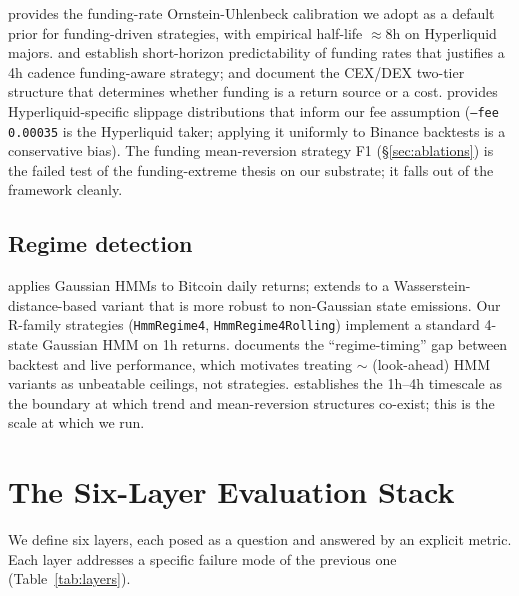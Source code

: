 \documentclass[11pt]{article}
\begin{document}
\citet{le2026fundingmm} provides the funding-rate Ornstein-Uhlenbeck
calibration we adopt as a default prior for funding-driven strategies, with
empirical half-life $\approx 8$h on Hyperliquid majors.
\citet{badawi2026funding4h} and \citet{inan2025fundingpred} establish
short-horizon predictability of funding rates that justifies a 4h cadence
funding-aware strategy; \citet{twotiered2026} and \citet{dexcarry2025} document
the CEX/DEX two-tier structure that determines whether funding is a return
source or a cost. \citet{sar2026} provides Hyperliquid-specific slippage
distributions that inform our fee assumption (\texttt{--fee 0.00035} is the
Hyperliquid taker; applying it uniformly to Binance backtests is a
conservative bias). The funding mean-reversion strategy F1
(\S\ref{sec:ablations}) is the failed test of the funding-extreme thesis on
our substrate; it falls out of the framework cleanly.

\subsection{Regime detection}

\citet{pang2026hmmbtc} applies Gaussian HMMs to Bitcoin daily returns;
\citet{wassersteinhmm2026} extends to a Wasserstein-distance-based variant
that is more robust to non-Gaussian state emissions. Our R-family strategies
(\texttt{HmmRegime4}, \texttt{HmmRegime4Rolling}) implement a standard
4-state Gaussian HMM on 1h returns. \citet{backtestlive2026} documents the
``regime-timing'' gap between backtest and live performance, which motivates
treating $\sim$ (look-ahead) HMM variants as unbeatable ceilings, not
strategies. \citet{trendsreversion2025} establishes the 1h--4h timescale as
the boundary at which trend and mean-reversion structures co-exist; this is
the scale at which we run.

\section{The Six-Layer Evaluation Stack}
\label{sec:stack}

We define six layers, each posed as a question and answered by an explicit
metric. Each layer addresses a specific failure mode of the previous one
(Table~\ref{tab:layers}).
\end{document}

